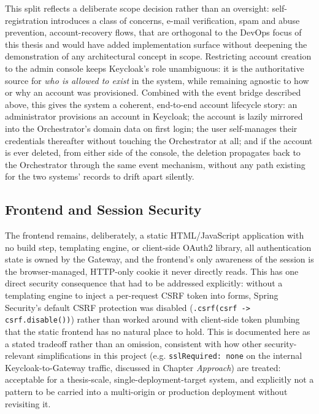\documentclass[twoside]{supsistudent}
\begin{document}
This split reflects a deliberate scope decision rather than an oversight: self-registration introduces a class of concerns, e-mail verification, spam and abuse prevention, account-recovery flows, that are orthogonal to the DevOps focus of this thesis and would have added implementation surface without deepening the demonstration of any architectural concept in scope. Restricting account creation to the admin console keeps Keycloak's role unambiguous: it is the authoritative source for \emph{who is allowed to exist} in the system, while remaining agnostic to how or why an account was provisioned. Combined with the event bridge described above, this gives the system a coherent, end-to-end account lifecycle story: an administrator provisions an account in Keycloak; the account is lazily mirrored into the Orchestrator's domain data on first login; the user self-manages their credentials thereafter without touching the Orchestrator at all; and if the account is ever deleted, from either side of the console, the deletion propagates back to the Orchestrator through the same event mechanism, without any path existing for the two systems' records to drift apart silently.

\subsection{Frontend and Session Security}
The frontend remains, deliberately, a static HTML/JavaScript application with no build step, templating engine, or client-side OAuth2 library, all authentication state is owned by the Gateway, and the frontend's only awareness of the session is the browser-managed, HTTP-only cookie it never directly reads. This has one direct security consequence that had to be addressed explicitly: without a templating engine to inject a per-request CSRF token into forms, Spring Security's default CSRF protection was disabled (\texttt{.csrf(csrf -> csrf.disable())}) rather than worked around with client-side token plumbing that the static frontend has no natural place to hold. This is documented here as a stated tradeoff rather than an omission, consistent with how other security-relevant simplifications in this project (e.g. \texttt{sslRequired: none} on the internal Keycloak-to-Gateway traffic, discussed in Chapter \emph{Approach}) are treated: acceptable for a thesis-scale, single-deployment-target system, and explicitly not a pattern to be carried into a multi-origin or production deployment without revisiting it.
\end{document}
